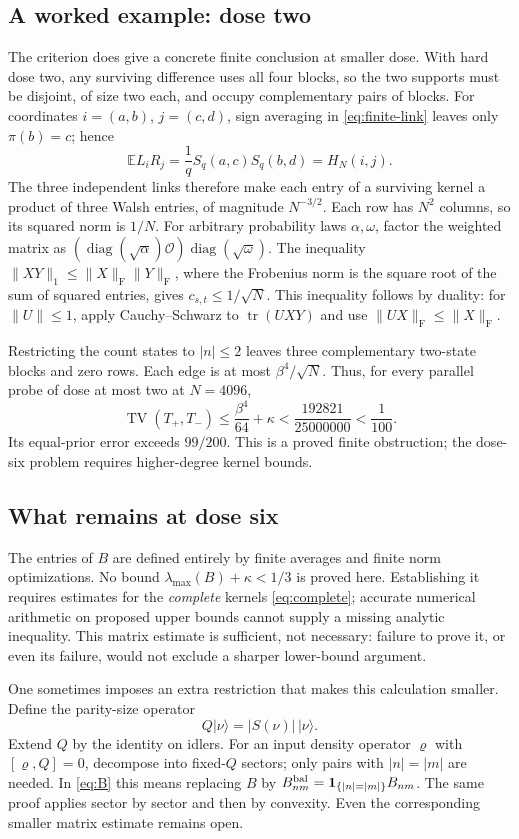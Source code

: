\documentclass[11pt]{article}
\newcommand{\E}{\mathbb E}
\newcommand{\TV}{\operatorname{TV}}
\newcommand{\diag}{\operatorname{diag}}
\newcommand{\1}{\mathbf 1}
\DeclareMathOperator{\tr}{tr}
\begin{document}
\subsection{A worked example: dose two}
The criterion does give a concrete finite conclusion at smaller dose.
With hard dose two, any surviving difference uses all four blocks, so
the two supports must be disjoint, of size two each, and occupy
complementary pairs of blocks. For coordinates $i=(a,b)$, $j=(c,d)$,
sign averaging in \eqref{eq:finite-link} leaves only $\pi(b)=c$; hence
\[
 \E L_iR_j=\frac1q S_q(a,c)S_q(b,d)=H_N(i,j).
\]
The three independent links therefore make each entry of a surviving
kernel a product of three Walsh entries, of magnitude $N^{-3/2}$.
Each row has $N^2$ columns, so its squared norm is $1/N$.
For arbitrary probability laws $\alpha,\omega$, factor the weighted
matrix as $(\diag(\sqrt\alpha)\mathcal O)\diag(\sqrt\omega)$.
The inequality $\|XY\|_1\le\|X\|_{\mathrm F}\|Y\|_{\mathrm F}$, where
the Frobenius norm is the square root of the sum of squared entries,
gives $c_{s,t}\le1/\sqrt N$. This inequality follows by duality:
for $\|U\|\le1$, apply Cauchy--Schwarz to
$\tr(UXY)$ and use $\|UX\|_{\mathrm F}\le\|X\|_{\mathrm F}$.

Restricting the count states to $|n|\le2$ leaves three complementary
two-state blocks and zero rows. Each edge is at most $\beta^4/\sqrt N$.
Thus, for every parallel probe of dose at most two at $N=4096$,
\[
 \TV(T_+,T_-)\le\frac{\beta^4}{64}+\kappa
       <\frac{192821}{25000000}<\frac1{100}.
\]
Its equal-prior error exceeds $99/200$. This is a proved finite
obstruction; the dose-six problem requires higher-degree kernel bounds.

\subsection{What remains at dose six}
The entries of $B$ are defined entirely by finite averages and finite
norm optimizations. No bound $\lambda_{\max}(B)+\kappa<1/3$ is proved
here. Establishing it requires estimates for the \emph{complete} kernels
\eqref{eq:complete}; accurate numerical arithmetic on proposed upper
bounds cannot supply a missing analytic inequality.
This matrix estimate is sufficient, not necessary: failure to prove it,
or even its failure, would not exclude a sharper lower-bound argument.

One sometimes imposes an extra restriction that makes this calculation
smaller. Define the parity-size operator
\[
                 Q|\nu\rangle=|S(\nu)|\,|\nu\rangle.
\]
Extend $Q$ by the identity on idlers. For an input density operator
$\varrho$ with $[\varrho,Q]=0$,
decompose into fixed-$Q$ sectors; only pairs with
$|n|=|m|$ are needed. In \eqref{eq:B} this means replacing $B$ by
$B^{\rm bal}_{nm}=\1_{\{|n|=|m|\}}B_{nm}$. The same proof applies
sector by sector and then by convexity. Even the corresponding smaller
matrix estimate remains open.
\end{document}
